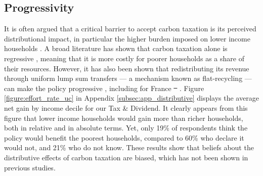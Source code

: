\documentclass[12pt]{article} %
\providecommand{\DIFaddtex}[1]{{\protect\color{blue}\uwave{#1}}} %
\providecommand{\DIFdeltex}[1]{{\protect\color{red}\sout{#1}}}                      %
\providecommand{\DIFaddbegin}{} %
\providecommand{\DIFaddend}{} %
\providecommand{\DIFdelbegin}{} %
\providecommand{\DIFdelend}{} %
\providecommand{\DIFadd}[1]{\texorpdfstring{\DIFaddtex{#1}}{#1}} %
\providecommand{\DIFdel}[1]{\texorpdfstring{\DIFdeltex{#1}}{}} %
\newcommand{\DIFscaledelfig}{0.5}
\newlength{\DIFdelgraphicswidth} %
\newlength{\DIFdelgraphicsheight} %
\newcommand{\DIFaddincludegraphics}[2][]{{\color{blue}\fbox{\DIFOincludegraphics[#1]{#2}}}} %
\newcommand{\DIFdelincludegraphics}[2][]{%
\sbox{\DIFdelgraphicsbox}{\DIFOincludegraphics[#1]{#2}}%
\settoboxwidth{\DIFdelgraphicswidth}{\DIFdelgraphicsbox} %
\settoboxtotalheight{\DIFdelgraphicsheight}{\DIFdelgraphicsbox} %
\scalebox{\DIFscaledelfig}{%
\parbox[b]{\DIFdelgraphicswidth}{\usebox{\DIFdelgraphicsbox}\\[-\baselineskip] \rule{\DIFdelgraphicswidth}{0em}}\llap{\resizebox{\DIFdelgraphicswidth}{\DIFdelgraphicsheight}{%
\setlength{\unitlength}{\DIFdelgraphicswidth}%
\begin{picture}(1,1)%
\thicklines\linethickness{2pt} %
{\color[rgb]{1,0,0}\put(0,0){\framebox(1,1){}}}%
{\color[rgb]{1,0,0}\put(0,0){\line( 1,1){1}}}%
{\color[rgb]{1,0,0}\put(0,1){\line(1,-1){1}}}%
\end{picture}%
}\hspace*{3pt}}} %
} %
\DeclareRobustCommand{\DIFaddbegin}{\DIFOaddbegin \let\includegraphics\DIFaddincludegraphics} %
\DeclareRobustCommand{\DIFaddend}{\DIFOaddend \let\includegraphics\DIFOincludegraphics} %
\DeclareRobustCommand{\DIFdelbegin}{\DIFOdelbegin \let\includegraphics\DIFdelincludegraphics} %
\DeclareRobustCommand{\DIFdelend}{\DIFOaddend \let\includegraphics\DIFOincludegraphics} %
\begin{document}


    \subsection{Progressivity}
It is often argued that a critical barrier to accept carbon taxation is its perceived distributional impact, in particular the higher burden imposed on lower income households \citep{bristow_public_2010,brannlund_tax_2012,gevrek_public_2015}. A broad literature has shown that carbon taxation alone is regressive \citep{poterba_is_1991,metcalf_distributional_1999,grainger_who_2010}, meaning that it is more costly for poorer households as a share of their resources. However, it has also been shown that redistributing its revenue through uniform lump sum transfers --- a mechanism known as flat-recycling --- can make the policy progressive \citep{west_williams_04,bento_distributional_2009,williams_initial_2015}, including for France \DIFdelbegin \DIFdel{\mbox{%
\citep{bureau_distributional_2011,douenne_vertical_2018}}\hspace{0pt}%
}\DIFdelend \DIFaddbegin \DIFadd{\mbox{%
\citep{bureau_distributional_2011,douenne_2020}}\hspace{0pt}%
}\DIFaddend . Figure \ref{figure:effort_rate_uc} in Appendix \ref{subsec:app_distributive} displays the average net gain by income decile for our Tax \& Dividend. It clearly appears from this figure that lower income households would gain more than richer households, both in relative and in absolute terms. Yet, only 19\% of respondents think the policy would benefit the poorest households, compared to 60\% who declare it would not, and 21\% who do not know. These results show that beliefs about the distributive effects of carbon taxation are biased, which has not been shown in previous studies. 
\end{document}
